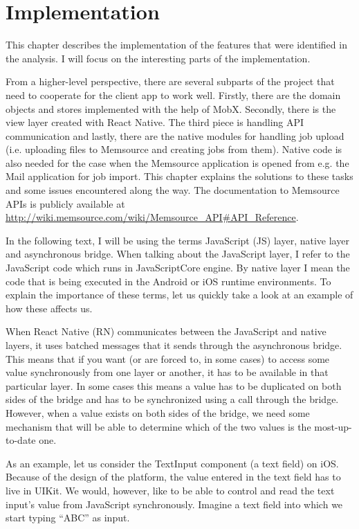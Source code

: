 \chapter{Implementation}

This chapter describes the implementation of the features that were identified in the analysis. I will focus on the interesting parts of the implementation.

From a higher-level perspective, there are several subparts of the project that need to cooperate for the client app to work well. Firstly, there are the domain objects and stores implemented with the help of MobX. Secondly, there is the view layer created with React Native. The third piece is handling API communication and lastly, there are the native modules for handling job upload (i.e. uploading files to Memsource and creating jobs from them). Native code is also needed for the case when the Memsource application is opened from e.g. the Mail application for job import. This chapter explains the solutions to these tasks and some issues encountered along the way. The documentation to Memsource APIs is publicly available at \href{http://wiki.memsource.com/wiki/Memsource_API#API_Reference.}{http://wiki.memsource.com/wiki/Memsource\_API\#API\_Reference}.


In the following text, I will be using the terms JavaScript (JS) layer, native layer and asynchronous bridge. When talking about the JavaScript layer, I refer to the JavaScript code which runs in JavaScriptCore engine. By native layer I mean the code that is being executed in the Android or iOS runtime environments. To explain the importance of these terms, let us quickly take a look at an example of how these affects us.

When React Native (RN) communicates between the JavaScript and native layers, it uses batched messages that it sends through the asynchronous bridge. This means that if you want (or are forced to, in some cases) to access some value synchronously from one layer or another, it has to be available in that particular layer. In some cases this means a value has to be duplicated on both sides of the bridge and has to be synchronized using a call through the bridge. However, when a value exists on both sides of the bridge, we need some mechanism that will be able to determine which of the two values is the most-up-to-date one. 

As an example, let us consider the TextInput component (a text field) on iOS. Because of the design of the platform, the value entered in the text field  has to live in UIKit. We would, however, like to be able to control and read the text input’s value from JavaScript synchronously. Imagine a text field into which we start typing “ABC” as input. 

